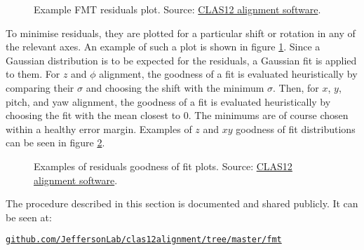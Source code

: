     \begin{figure}[b!]
        \centering{}
        \caption[Example FMT residuals plot]{Example FMT residuals plot.
        Source: \hyperlink{github.com/JeffersonLab/clas12alignment}{CLAS12 alignment software}.}
        \label{fig::res_example}
    \end{figure}

    To minimise residuals, they are plotted for a particular shift or rotation in any of the relevant axes.
    An example of such a plot is shown in figure \ref{fig::res_example}.
    Since a Gaussian distribution is to be expected for the residuals, a Gaussian fit is applied to them.
    For $z$ and $\phi$ alignment, the goodness of a fit is evaluated heuristically by comparing their $\sigma$ and choosing the shift with the minimum $\sigma$.
    Then, for $x$, $y$, pitch, and yaw alignment, the goodness of a fit is evaluated heuristically by choosing the fit with the mean closest to $0$.
    The minimums are of course chosen within a healthy error margin.
    Examples of $z$ and $xy$ goodness of fit distributions can be seen in figure \ref{fig::resfit_example}.

    \begin{figure}[t!]
        \centering{}
        \caption[Examples of residuals goodness of fit plots]{Examples of residuals goodness of fit plots.
        Source: \hyperlink{github.com/JeffersonLab/clas12alignment}{CLAS12 alignment software}.}
        \label{fig::resfit_example}
    \end{figure}

    
    

    The procedure described in this section is documented and shared publicly.
    It can be seen at:

    \href{github.com/JeffersonLab/clas12alignment/tree/master/fmt}{\texttt{github.com/JeffersonLab/clas12alignment/tree/master/fmt}}
